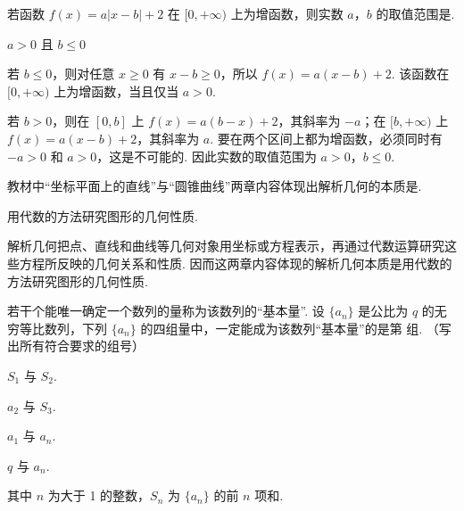 \begin{problem}
若函数 \( f(x) = a|x - b| + 2 \) 在 \([0, +\infty)\) 上为增函数，则实数 \(a\)，\(b\) 的取值范围是\fillinblank{}.

\end{problem}

\begin{answer}
\(a>0\) 且 \(b\leqslant 0\)
\end{answer}

\begin{solution}
若 \(b\leqslant0\)，则对任意 \(x\geqslant0\) 有 \(x-b\geqslant0\)，所以 \(f(x)=a(x-b)+2\). 该函数在 \([0,+\infty)\) 上为增函数，当且仅当 \(a>0\).

若 \(b>0\)，则在 \([0,b]\) 上 \(f(x)=a(b-x)+2\)，其斜率为 \(-a\)；在 \([b,+\infty)\) 上 \(f(x)=a(x-b)+2\)，其斜率为 \(a\). 要在两个区间上都为增函数，必须同时有 \(-a>0\) 和 \(a>0\)，这是不可能的. 因此实数的取值范围为 \(a>0\)，\(b\leqslant0\).
\end{solution}

\begin{problem}
教材中“坐标平面上的直线”与“圆锥曲线”两章内容体现出解析几何的本质是\fillinblank{}.

\end{problem}

\begin{answer}
用代数的方法研究图形的几何性质.
\end{answer}

\begin{solution}
解析几何把点、直线和曲线等几何对象用坐标或方程表示，再通过代数运算研究这些方程所反映的几何关系和性质. 因而这两章内容体现的解析几何本质是用代数的方法研究图形的几何性质.
\end{solution}

\begin{problem}
若干个能唯一确定一个数列的量称为该数列的“基本量”. 设 \(\{a_{n}\}\) 是公比为 \(q\) 的无穷等比数列，下列 \(\{a_{n}\}\) 的四组量中，一定能成为该数列“基本量”的是第\fillinblank{} 组. （写出所有符合要求的组号）

\begin{circlelist}
\item \(S_{1}\) 与 \(S_{2}\).
\item \(a_{2}\) 与 \(S_{3}\).
\item \(a_{1}\) 与 \(a_{n}\).
\item \(q\) 与 \(a_{n}\).
\end{circlelist}

其中 \(n\) 为大于 1 的整数，\(S_{n}\) 为 \(\{a_{n}\}\) 的前 \(n\) 项和.
\end{problem}

